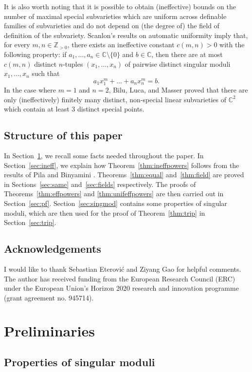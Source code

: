 \documentclass[11pt,a4paper, british]{amsart}
\theoremstyle{definition}
\theoremstyle{remark}
\numberwithin{equation}{section}
\newcommand{\Z}{\mathbb{Z}} %
\newcommand{\C}{\mathbb{C}} %
\begin{document}
It is also worth noting that it is possible to obtain (ineffective) bounds on the number of maximal special subvarieties which are uniform across definable families of subvarieties and do not depend on (the degree of) the field of definition of the subvariety. Scanlon's results on automatic uniformity \cite[Theorem~4.2]{Scanlon04} imply that, for every $m, n \in \Z_{>0}$, there exists an ineffective constant $c(m, n) > 0$ with the following property: if $a_1, \ldots, a_n \in \C \setminus \{0\}$ and $b \in \C$, then there are at most $c(m, n)$ distinct $n$-tuples $(x_1, \ldots, x_n)$ of pairwise distinct singular moduli $x_1, \ldots, x_n$ such that
\[ a_1 x_1^m + \ldots + a_n x_n^m = b.\]
In the case where $m=1$ and $n=2$, Bilu, Luca, and Masser \cite[Theorem~1.1]{BiluLucaMasser17} proved that there are only (ineffectively) finitely many distinct, non-special linear subvarieties of $\C^2$ which contain at least $3$ distinct special points.

\subsection{Structure of this paper}
In Section~\ref{sec:prelim}, we recall some facts needed throughout the paper. In Section~\ref{sec:ineff}, we explain how Theorem~\ref{thm:ineffpowers} follows from the results of Pila \cite{Pila11} and Binyamini \cite{Binyamini19}. Theorems~\ref{thm:equal} and~\ref{thm:field} are proved in Sections~\ref{sec:same} and~\ref{sec:fields} respectively. The proofs of Theorems~\ref{thm:effpowers} and \ref{thm:unifeffpowers} are then carried out in Section~\ref{sec:pf}. Section~\ref{sec:singmod} contains some properties of singular moduli, which are then used for the proof of Theorem~\ref{thm:trip} in Section~\ref{sec:trip}.

\subsection{Acknowledgements} I would like to thank Sebastian Eterovi\'{c} and Ziyang Gao for helpful comments. The author has received funding from the European Research Council (ERC) under the European Union’s Horizon 2020 research and innovation programme (grant agreement no. 945714).

\section{Preliminaries}\label{sec:prelim}


\subsection{Properties of singular moduli}\label{subsec:singmods}
\end{document}
